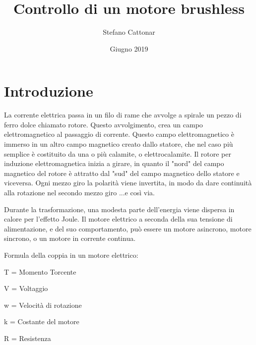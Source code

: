 \documentclass[a4paper]{report}
\title{Controllo di un motore brushless}
\author{Stefano Cattonar}
\date{Giugno 2019}
\begin{document}
\maketitle
\tableofcontents

\section*{Introduzione}
La corrente elettrica passa in un filo di rame che avvolge a spirale un pezzo di ferro dolce chiamato
rotore. Questo avvolgimento, crea un campo elettromagnetico al passaggio di corrente. Questo campo elettromagnetico è immerso in un altro campo magnetico creato dallo statore, che nel caso più semplice è costituito da una o più calamite, o elettrocalamite. Il rotore per induzione elettromagnetica inizia a girare, in
quanto il "nord" del campo magnetico del rotore è attratto dal
"sud" del campo magnetico dello statore e viceversa. Ogni
mezzo giro la polarità viene invertita, in modo da dare
continuità alla rotazione nel secondo mezzo giro ...e così via.

Durante la trasformazione, una modesta parte dell'energia
viene dispersa in calore per l'effetto Joule. Il motore elettrico a seconda della sua tensione di
alimentazione, e del suo comportamento, può essere un motore asincrono, motore sincrono, o un
motore in corrente continua.


    Formula della coppia in un motore elettrico:
    \newline
    \begin{center}\LARGE{
    }
    \end{center}
    
    
        T = Momento Torcente

        V = Voltaggio

        w = Velocità di rotazione

        k = Costante del motore

        R = Resistenza
\end{document}
